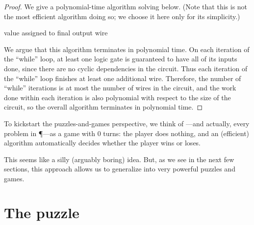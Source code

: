 \begin{proof}
  We give a polynomial-time algorithm solving  below.
  (Note that this is not the most efficient algorithm doing so; we choose it
  here only for its simplicity.)

  \begin{algorithm}{}{}
    \begin{algorithmic}
      \EndIf%
      \EndFor%
      \EndWhile%
      \State \Return value assigned to final output wire%
    \end{algorithmic}
  \end{algorithm}

  We argue that this algorithm terminates in polynomial time.  On each
  iteration of the ``while'' loop, at least one logic gate is guaranteed to
  have all of its inputs done, since there are no cyclic dependencies in the
  circuit.  Thus each iteration of the ``while'' loop finishes at least one
  additional wire.  Therefore, the number of ``while'' iterations is at most
  the number of wires in the circuit, and the work done within each iteration
  is also polynomial with respect to the size of the circuit, so the overall
  algorithm terminates in polynomial time.
\end{proof}

To kickstart the puzzles-and-games perspective, we think of ---and actually, every problem in \P---as a game with \(0\) turns: the
player does nothing, and an (efficient) algorithm automatically decides whether
the player wins or loses.

This seems like a silly (arguably boring) idea.  But, as we see in the next few
sections, this approach allows us to generalize  into
very powerful puzzles and games.

\section{The  puzzle}


